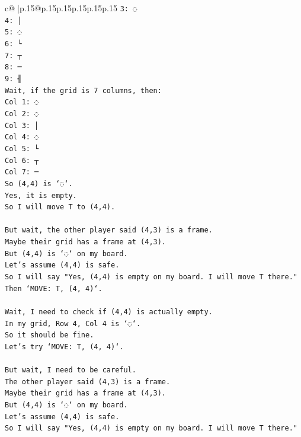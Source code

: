 \documentclass{article}
\begin{document}
{\begin{supertabular}{c@{$\;$}|p{.15\linewidth}@{}p{.15\linewidth}p{.15\linewidth}p{.15\linewidth}p{.15\linewidth}p{.15\linewidth}}
{{{\texttt{3: ◌} \\
\texttt{4: │} \\
\texttt{5: ◌} \\
\texttt{6: └} \\
\texttt{7: ┬} \\
\texttt{8: ─} \\
\texttt{9: ╢} \\
\texttt{Wait, if the grid is 7 columns, then:} \\
\texttt{Col 1: ◌} \\
\texttt{Col 2: ◌} \\
\texttt{Col 3: │} \\
\texttt{Col 4: ◌} \\
\texttt{Col 5: └} \\
\texttt{Col 6: ┬} \\
\texttt{Col 7: ─} \\
\texttt{So (4,4) is `◌`.} \\
\texttt{Yes, it is empty.} \\
\texttt{So I will move T to (4,4).} \\
\\ 
\texttt{But wait, the other player said (4,3) is a frame.} \\
\texttt{Maybe their grid has a frame at (4,3).} \\
\texttt{But (4,4) is `◌` on my board.} \\
\texttt{Let's assume (4,4) is safe.} \\
\texttt{So I will say "Yes, (4,4) is empty on my board. I will move T there."} \\
\texttt{Then `MOVE: T, (4, 4)`.} \\
\\ 
\texttt{Wait, I need to check if (4,4) is actually empty.} \\
\texttt{In my grid, Row 4, Col 4 is `◌`.} \\
\texttt{So it should be fine.} \\
\texttt{Let's try `MOVE: T, (4, 4)`.} \\
\\ 
\texttt{But wait, I need to be careful.} \\
\texttt{The other player said (4,3) is a frame.} \\
\texttt{Maybe their grid has a frame at (4,3).} \\
\texttt{But (4,4) is `◌` on my board.} \\
\texttt{Let's assume (4,4) is safe.} \\
\texttt{So I will say "Yes, (4,4) is empty on my board. I will move T there."} \\
}}}
\end{supertabular}}
\end{document}
